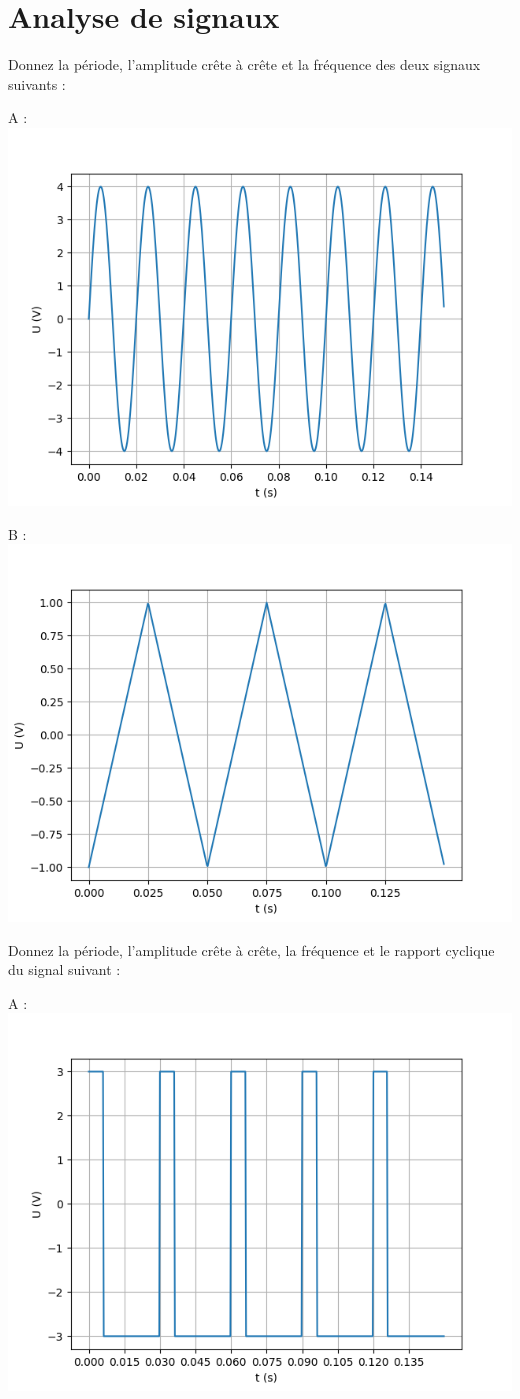 \documentclass[10pt,fleqn]{article} %
\begin{document}
\section{Analyse de signaux}
\begin{exercise}
  \begin{question}
    Donnez la période, l'amplitude crête à crête et la fréquence des deux signaux suivants :

    A : \includegraphics[width=.5\textwidth]{images/sinus}

    B : \includegraphics[width=.5\textwidth]{images/triangle}
  \end{question}
  \begin{question}
    Donnez la période, l'amplitude crête à crête, la fréquence et le rapport cyclique du signal suivant :

    A : \includegraphics[width=.5\textwidth]{images/carre}
  \end{question}
\end{exercise}
\end{document}
